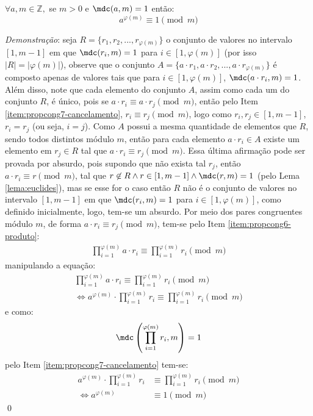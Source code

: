 \begin{teorema}
\label{eq : euler-fermat}
$\forall a, m \in \mathbb{Z},$ se  $ m > 0$  e $\mdc(a,m) = 1$ então:
    \begin{equation*}
        a^{\varphi(m)} \equiv 1 \pmod{m}
    \end{equation*}
\end{teorema}

\noindent
\textit{Demonstração}: seja $R = \{r_1, r_2, ..., r_{\varphi(m)}\}$ o conjunto de valores no intervalo $[1, m-1]$ em que $\mdc(r_i, m) = 1$ para $i \in [1, \varphi(m)]$ (por isso $|R| = |\varphi(m)|$), observe que o conjunto $A = \{a \cdot r_1, a \cdot r_2, ..., a \cdot r_{\varphi(m)}\}$ é composto apenas de valores tais que para $i \in [1, \varphi(m)]$, $\mdc(a \cdot r_i, m) = 1$. Além disso, note que cada elemento do conjunto $A$, assim como cada um do conjunto $R$, é único, pois se $a \cdot r_i \equiv a \cdot r_j \pmod{m}$, então pelo Item \ref{item:propcong7-cancelamento}, $r_i \equiv r_j \pmod{m}$, logo como $r_i, r_j \in [1, m-1]$, $r_i = r_j$ (ou seja, $i = j$). Como $A$ possui a mesma quantidade de elementos que $R$, sendo todos distintos módulo $m$, então para cada elemento $a \cdot r_i \in A$ existe um elemento em $r_j \in R$ tal que $a \cdot r_i \equiv r_j \pmod{m}$. Essa última afirmação pode ser provada por absurdo, pois supondo que não exista tal $r_j$, então $a \cdot r_i \equiv r \pmod{m}$, tal que $r \not\in R \land r \in [1, m-1] \land \mdc(r, m) = 1$ (pelo Lema \ref{lema:euclides}), mas se esse for o caso então $R$ não é o conjunto de valores no intervalo $[1, m-1]$ em que $\mdc(r_i, m) = 1$ para $i \in [1, \varphi(m)]$, como definido inicialmente, logo, tem-se um absurdo.
Por meio dos pares congruentes módulo $m$, de forma $a \cdot r_i \equiv r_j \pmod{m}$, tem-se pelo Item \ref{item:propcong6-produto}:
\begin{align*}
    \prod_{i = 1}^{\varphi(m)} a \cdot r_i \equiv \prod_{i = 1}^{\varphi(m)} r_i \pmod{m}
\end{align*}
manipulando a equação:
\begin{align*}
    \prod_{i = 1}^{\varphi(m)} a \cdot r_i \equiv \prod_{i = 1}^{\varphi(m)} r_i \pmod{m}
    \\
    \Longleftrightarrow a^{\varphi(m)} \cdot \prod_{i = 1}^{\varphi(m)} r_i \equiv \prod_{i = 1}^{\varphi(m)} r_i \pmod{m}
\end{align*}
e como:
\begin{equation*}
    \mdc\left(\prod_{i = 1}^{\varphi(m)} r_i, m\right) = 1
\end{equation*}
pelo Item \ref{item:propcong7-cancelamento} tem-se:
\begin{align*}
    a^{\varphi(m)} \cdot \prod_{i = 1}^{\varphi(m)} r_i & \equiv \prod_{i = 1}^{\varphi(m)} r_i \pmod{m}
    \\
    \Longleftrightarrow a^{\varphi(m)} & \equiv 1 \pmod{m} 
\end{align*} \qed

